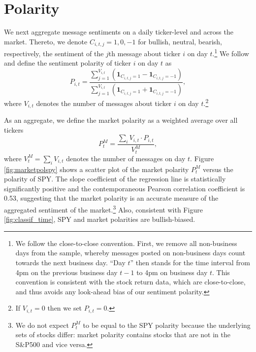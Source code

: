 





\section{Polarity}\label{S:polarity}

We next aggregate message sentiments on a daily ticker-level and across the market. Thereto, we denote $C_{i,t,j}=1,0,-1$ for bullish, neutral, bearish, respectively, the sentiment of the $j$th message about ticker $i$ on day $t$.\footnote{We follow the close-to-close convention. First, we remove all non-business days from the sample, whereby messages posted on non-business days count towards the next business day. ``Day $t$'' then stands for the time interval from 4pm on the previous business day $t-1$ to 4pm on business day $t$. This convention is consistent with the stock return data, which are close-to-close, and thus avoids any look-ahead bias of our sentiment polarity.} We follow \citet{ranco2015effects} and define the sentiment polarity of ticker $i$ on day $t$ as
\begin{equation}
    P_{i,t} = \dfrac{\sum_{j=1}^{V_{i,t}} (\textbf{1}_{C_{i,t,j} = 1} - \textbf{1}_{C_{i,t,j} = -1})}{\sum_{j=1}^{V_{i,t}} (\textbf{1}_{C_{i,t,j} = 1} + \textbf{1}_{C_{i,t,j} = -1})},
\end{equation}
where $V_{i,t}$ denotes the number of messages about ticker $i$ on day $t$.\footnote{If $V_{i,t}=0$ then we set $P_{i,t} =0$.} 

As an aggregate, we define the market polarity as a weighted average over all tickers 
\begin{equation}
\label{marketpoleq}
    P_t^M = \dfrac{\sum_{i} V_{i,t} \cdot P_{i,t}}{V^M_t} ,
\end{equation}
where $V^M_t = \sum_{i} V_{i,t}$ denotes the number of messages on day $t$. Figure \ref{fig:marketpolspy} shows a scatter plot of the market polarity $P_{t}^M$ versus the polarity of SPY. The slope coefficient of the regression line is statistically significantly positive and the contemporaneous Pearson correlation coefficient is 0.53, suggesting that the market polarity is an accurate measure of the aggregated sentiment of the market.\footnote{We do not expect $P^M_t$ to be equal to the SPY polarity because the underlying sets of stocks differ: market polarity contains stocks that are not in the S\&P500 and vice versa.} Also, consistent with Figure \ref{fig:classif_time}, SPY and market polarities are bullish-biased.

